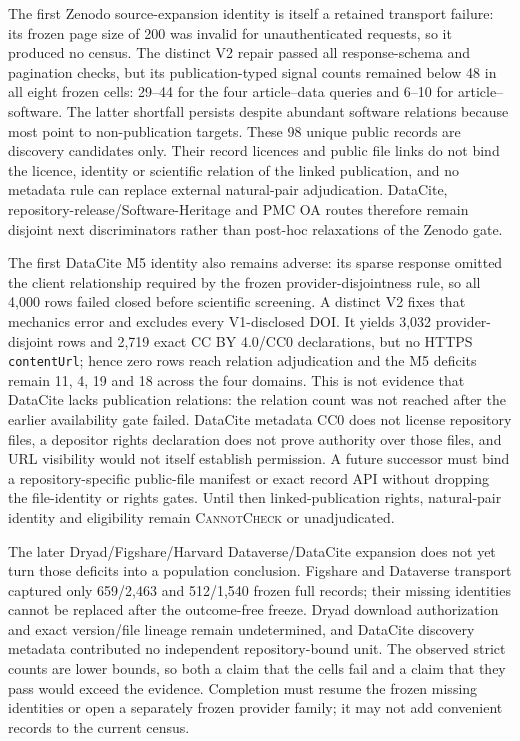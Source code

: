 The first Zenodo source-expansion identity is itself a retained transport
failure: its frozen page size of 200 was invalid for unauthenticated requests,
so it produced no census.  The distinct V2 repair passed all response-schema
and pagination checks, but its publication-typed signal counts remained below
48 in all eight frozen cells: 29--44 for the four article--data queries and
6--10 for article--software.  The latter shortfall persists despite abundant
software relations because most point to non-publication targets.  These 98
unique public records are discovery candidates only.  Their record licences
and public file links do not bind the licence, identity or scientific relation
of the linked publication, and no metadata rule can replace external
natural-pair adjudication.  DataCite, repository-release/Software-Heritage and
PMC OA routes therefore remain disjoint next discriminators rather than
post-hoc relaxations of the Zenodo gate.

The first DataCite M5 identity also remains adverse: its sparse response omitted
the client relationship required by the frozen provider-disjointness rule, so
all 4,000 rows failed closed before scientific screening. A distinct V2 fixes
that mechanics error and excludes every V1-disclosed DOI. It yields 3,032
provider-disjoint rows and 2,719 exact CC BY 4.0/CC0 declarations, but no HTTPS
\texttt{contentUrl}; hence zero rows reach relation adjudication and the M5
deficits remain 11, 4, 19 and 18 across the four domains. This is not evidence
that DataCite lacks publication relations: the relation count was not reached
after the earlier availability gate failed. DataCite metadata CC0 does not
license repository files, a depositor rights declaration does not prove
authority over those files, and URL visibility would not itself establish
permission. A future successor must bind a repository-specific public-file
manifest or exact record API without dropping the file-identity or rights gates.
Until then linked-publication rights, natural-pair identity and eligibility
remain \textsc{CannotCheck} or unadjudicated.

The later Dryad/Figshare/Harvard Dataverse/DataCite expansion does not yet turn
those deficits into a population conclusion. Figshare and Dataverse transport
captured only 659/2,463 and 512/1,540 frozen full records; their missing
identities cannot be replaced after the outcome-free freeze. Dryad download
authorization and exact version/file lineage remain undetermined, and DataCite
discovery metadata contributed no independent repository-bound unit. The
observed strict counts are lower bounds, so both a claim that the cells fail
and a claim that they pass would exceed the evidence. Completion must resume
the frozen missing identities or open a separately frozen provider family; it
may not add convenient records to the current census.

